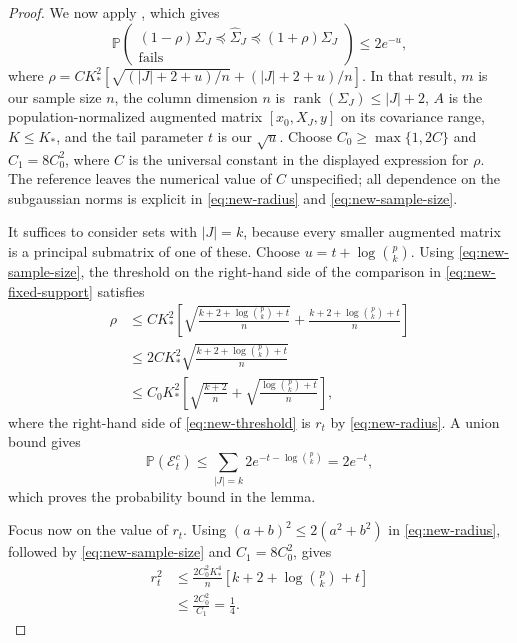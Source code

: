 \documentclass[a4paper,10pt,english]{article}
\theoremstyle{definition}
\DeclareMathOperator{\rank}{rank}
\begin{document}
\begin{review}
\begin{proof}
We now apply \citet[Theorem~4.6.1 and equation~(4.22)]{vershynin2018hdp},
which gives
\begin{equation}\label{eq:new-fixed-support}
 \mathbb P\left(
 \begin{gathered}
 (1-\rho)\Sigma_J\preceq\widehat\Sigma_J
 \preceq(1+\rho)\Sigma_J\\[-2pt]
 \text{fails}
 \end{gathered}
 \right)\le2e^{-u},
\end{equation}
where
\(\rho=CK_*^2[\sqrt{(|J|+2+u)/n}+(|J|+2+u)/n]\).
\rbreak
In that result, \(m\) is our sample size \(n\), the column dimension
\(n\) is \(\rank(\Sigma_J)\le |J|+2\), \(A\) is the
population-normalized augmented matrix \([x_0,X_J,y]\) on its covariance
range, \(K\le K_*\), and the tail parameter \(t\) is our \(\sqrt u\).
\rbreak
Choose \(C_0\ge\max\{1,2C\}\) and \(C_1=8C_0^2\), where \(C\)
is the universal constant in the displayed expression for \(\rho\).
\rbreak
The reference leaves the numerical value of \(C\) unspecified;
all dependence on the subgaussian norms is explicit in
\eqref{eq:new-radius} and \eqref{eq:new-sample-size}.

It suffices to consider sets with \(|J|=k\), because every smaller
augmented matrix is a principal submatrix of one of these.
\rbreak
Choose \(u=t+\log\binom pk\).
\rbreak
Using \eqref{eq:new-sample-size}, the threshold on the right-hand side
of the comparison in \eqref{eq:new-fixed-support} satisfies
\begin{equation}\label{eq:new-threshold}
 \begin{aligned}
 \rho
 &\le CK_*^2\left[
 \sqrt{\frac{k+2+\log\binom pk+t}{n}}
 +\frac{k+2+\log\binom pk+t}{n}
 \right]\\
 &\le2CK_*^2\sqrt{\frac{k+2+\log\binom pk+t}{n}}\\
 &\le C_0K_*^2\left[
 \sqrt{\frac{k+2}{n}}
 +\sqrt{\frac{\log\binom pk+t}{n}}
 \right],
 \end{aligned}
\end{equation}
where the right-hand side of \eqref{eq:new-threshold} is \(r_t\)
by \eqref{eq:new-radius}.
\rbreak
A union bound gives
\begin{equation}\label{eq:new-probability}
 \mathbb P(\mathcal E_t^c)
 \le\sum_{|J|=k}2e^{-t-\log\binom pk}
 =2e^{-t},
\end{equation}
which proves the probability bound in the lemma.

Focus now on the value of \(r_t\).
\rbreak
Using \((a+b)^2\le2(a^2+b^2)\) in \eqref{eq:new-radius}, followed by
\eqref{eq:new-sample-size} and \(C_1=8C_0^2\), gives
\begin{equation}\label{eq:new-radius-small}
 \begin{aligned}
 r_t^2
 &\le\frac{2C_0^2K_*^4}{n}
 \left[k+2+\log\binom pk+t\right]\\
 &\le\frac{2C_0^2}{C_1}=\frac14.
 \end{aligned}
\end{equation}


\end{proof}
\end{review}
\end{document}
